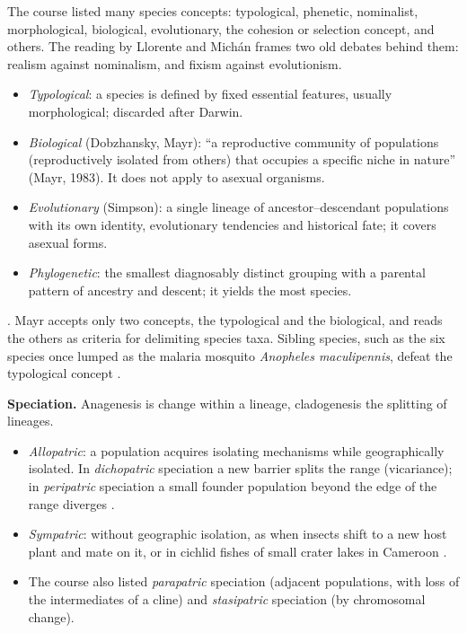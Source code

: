 The course listed many species concepts:
typological, phenetic, nominalist,
morphological, biological, evolutionary,
the cohesion or selection concept, and
others. The reading by Llorente and
Mich\'an frames two old debates behind
them: realism against nominalism, and
fixism against evolutionism.
\begin{itemize}
\item \emph{Typological}: a species is
defined by fixed essential features,
usually morphological; discarded after
Darwin.
\item \emph{Biological} (Dobzhansky,
Mayr): ``a reproductive community of
populations (reproductively isolated from
others) that occupies a specific niche in
nature'' (Mayr, 1983). It does not apply
to asexual organisms.
\item \emph{Evolutionary} (Simpson): a
single lineage of ancestor--descendant
populations with its own identity,
evolutionary tendencies and historical
fate; it covers asexual forms.
\item \emph{Phylogenetic}: the smallest
diagnosably distinct grouping with a
parental pattern of ancestry and descent;
it yields the most species.
\end{itemize}
\cite[Chapter 4]{hickman2002animal}.
Mayr accepts only two concepts, the
typological and the biological, and reads
the others as criteria for delimiting
species taxa. Sibling species, such as the
six species once lumped as the malaria
mosquito \emph{Anopheles maculipennis},
defeat the typological concept
\cite[Chapter 8]{mayr2002evolution}.

\textbf{Speciation.} Anagenesis is change
within a lineage, cladogenesis the
splitting of lineages.
\begin{itemize}
\item \emph{Allopatric}: a population
acquires isolating mechanisms while
geographically isolated. In
\emph{dichopatric} speciation a new
barrier splits the range (vicariance); in
\emph{peripatric} speciation a small
founder population beyond the edge of the
range diverges
\cite[Chapter 9]{mayr2002evolution}.
\item \emph{Sympatric}: without
geographic isolation, as when insects
shift to a new host plant and mate on it,
or in cichlid fishes of small crater lakes
in Cameroon
\cite[Chapter 9]{mayr2002evolution}.
\item The course also listed
\emph{parapatric} speciation (adjacent
populations, with loss of the
intermediates of a cline) and
\emph{stasipatric} speciation (by
chromosomal change).
\end{itemize}

